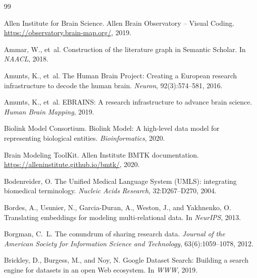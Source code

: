 \documentclass{article}
\theoremstyle{definition}
\begin{document}

\begin{thebibliography}{99}

Allen Institute for Brain Science.
\newblock Allen Brain Observatory -- Visual Coding.
\newblock \url{https://observatory.brain-map.org/}, 2019.

Ammar, W., et~al.
\newblock Construction of the literature graph in Semantic Scholar.
\newblock In \emph{NAACL}, 2018.

Amunts, K., et~al.
\newblock The Human Brain Project: Creating a European research infrastructure to decode the human brain.
\newblock \emph{Neuron}, 92(3):574--581, 2016.

Amunts, K., et~al.
\newblock EBRAINS: A research infrastructure to advance brain science.
\newblock \emph{Human Brain Mapping}, 2019.

Biolink Model Consortium.
\newblock Biolink Model: A high-level data model for representing biological entities.
\newblock \emph{Bioinformatics}, 2020.

Brain Modeling ToolKit.
\newblock Allen Institute BMTK documentation.
\newblock \url{https://alleninstitute.github.io/bmtk/}, 2020.

Bodenreider, O.
\newblock The Unified Medical Language System (UMLS): integrating biomedical terminology.
\newblock \emph{Nucleic Acids Research}, 32:D267--D270, 2004.

Bordes, A., Usunier, N., Garcia-Duran, A., Weston, J., and Yakhnenko, O.
\newblock Translating embeddings for modeling multi-relational data.
\newblock In \emph{NeurIPS}, 2013.

Borgman, C.~L.
\newblock The conundrum of sharing research data.
\newblock \emph{Journal of the American Society for Information Science and Technology}, 63(6):1059--1078, 2012.

Brickley, D., Burgess, M., and Noy, N.
\newblock Google Dataset Search: Building a search engine for datasets in an open Web ecosystem.
\newblock In \emph{WWW}, 2019.


\end{thebibliography}
\end{document}
